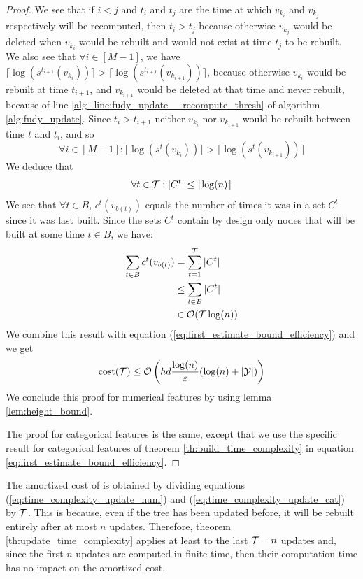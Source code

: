 \begin{proof}
    We see that if $i<j$ and $t_i$ and $t_j$ are the time at which $v_{k_i}$ and $v_{k_j}$ respectively will be recomputed, then $t_i > t_j$ because otherwise $v_{k_j}$ would be deleted when $v_{k_i}$ would be rebuilt and would not exist at time $t_j$ to be rebuilt. We also see that $\forall i \in [M-1]$, we have $\lceil\log(s^{t_{i+1}}(v_{k_i}))\rceil > \lceil\log(s^{t_{i+1}}(v_{k_{i+1}}))\rceil$, because otherwise $v_{k_i}$ would be rebuilt at time $t_{i+1}$, and $v_{k_{i+1}}$ would be deleted at that time and never rebuilt, because of line \ref{alg_line:fudy_update__recompute_thresh} of algorithm \ref{alg:fudy_update}. Since $t_{i} > t_{i+1}$ neither $v_{k_i}$ nor $v_{k_{i+1}}$ would be rebuilt between time $t$ and $t_i$, and so
    \begin{equation*}
        \forall i \in [M-1] : \lceil\log(s^{t}(v_{k_i}))\rceil > \lceil\log(s^{t}(v_{k_{i+1}}))\rceil
    \end{equation*}
    We deduce that 
    \begin{equation}
        \forall t \in \mathcal{T}: |C^t| \leq \lceil\log(n)\rceil
    \end{equation}
    We see that $\forall t \in B$, $c^t(v_{b(t)})$ equals the number of times it was in a set $C^t$ since it was last built. Since the sets $C^t$ contain by design only nodes that will be built at some time $t\in B$, we have:
    \begin{align*}
        \sum_{t \in B} c^t(v_{b(t)}) &= \sum_{t = 1}^{\mathcal{T}} |C^t|\\
        & \leq \sum_{t \in B}|C^t|\\
        & \in \mathcal{O}(\mathcal{T} \log(n))
    \end{align*}
    We combine this result with equation (\ref{eq:first_estimate_bound_efficiency}) and we get
    \begin{equation*}
        \text{cost}(\mathcal{T}) \leq \mathcal{O}\left(hd\frac{\log(n)}{\varepsilon}(\log(n) + |\mathcal{Y}|)\right)
    \end{equation*}
    We conclude this proof for numerical features by using lemma \ref{lem:height_bound}.

    The proof for categorical features is the same, except that we use the specific result for categorical features of theorem \ref{th:build_time_complexity} in equation \ref{eq:first_estimate_bound_efficiency}.
\end{proof}

The amortized cost of \AlgoUpdate{} is obtained by dividing equations (\ref{eq:time_complexity_update_num}) and (\ref{eq:time_complexity_update_cat}) by $\mathcal{T}$. This is because, even if the tree has been updated before, it will be rebuilt entirely after at most $n$ updates. Therefore, theorem \ref{th:update_time_complexity} applies at least to the last $\mathcal{T} - n$ updates and, since the first $n$ updates are computed in finite time, then their computation time has no impact on the amortized cost.

